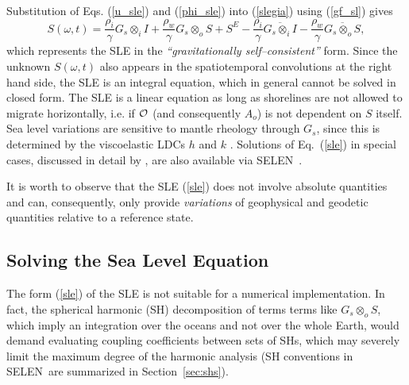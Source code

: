 \documentclass[11pt,fleqn,a4paper,titlepage]{article}
\newcommand\selen{\textsf{SELEN~}}
\begin{document}
Substitution of Eqs. (\ref{u_sle}) and (\ref{phi_sle}) into (\ref{slegia}) using (\ref{gf_sl}) gives 
\begin{equation}\label{sle}
S(\omega, t) = \frac{\rho_i}{\gamma} G_s^{} {\otimes}_i I + \frac{\rho_w}{\gamma} G_s^{} {\otimes}_o S 
                             + S^E 
-\frac{\rho_i}{\gamma} \overline {G_s^{} {\otimes}_i I}
-\frac{\rho_w}{\gamma} \overline {G_s^{} {\otimes}_o S}, 
\end{equation}
which represents the SLE in the \emph{``gravitationally self--consistent''} form. Since the unknown $S(\omega,t)$ also appears in the spatiotemporal convolutions at the right hand side, the SLE is an integral equation, which in general cannot be solved in closed form. 
The SLE is a linear equation as long as shorelines are not allowed to migrate horizontally, i.e. if ${\cal O}$ (and consequently $A_o$) 
is not dependent on $S$ itself. Sea level variations are sensitive to mantle rheology through $G_{s}$, since this is determined by the viscoelastic LDCs $h$ and $k$ \citep{Spada-2003a, Spada_and_Stocchi_2006}. Solutions of Eq.~(\ref{sle}) in special cases, discussed in detail by \citet{Spada_and_Stocchi_2006}, are also available via \selen. 

It is worth to observe that the SLE (\ref{sle}) does not involve absolute quantities and can, consequently, only provide \textit{variations} of geophysical and geodetic quantities relative to a reference state. 

\subsection{Solving the Sea Level Equation}\label{sec:solve-the-sle}

The form (\ref{sle}) of the SLE is not suitable for a numerical implementation. In fact,
the spherical harmonic (SH) decomposition of terms terms like $ G_s^{}{\otimes}_o S$, which 
imply an integration over the oceans and not over the whole Earth, would demand evaluating 
coupling coefficients between sets of SHs, which may severely limit the maximum degree of the 
harmonic analysis (SH conventions in \selen are summarized in Section~\ref{sec:shs}). 
\end{document}
